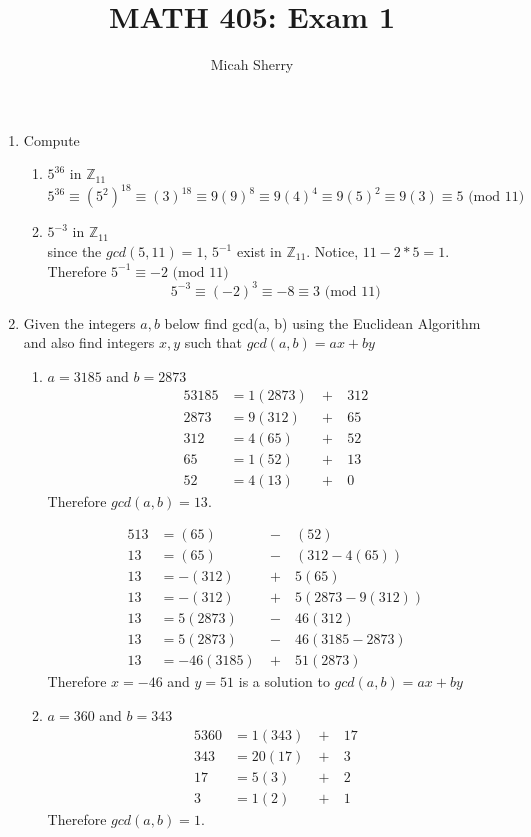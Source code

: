 \documentclass{article}
\title{MATH 405: Exam 1 }
\author{Micah Sherry}
\newcommand{\Z}{\mathbb{Z}}
\begin{document}
	\maketitle
	\begin{enumerate}
	\item Compute
	\begin{enumerate}
		\item $5^{36}$ in $\Z_{11}$
		$$
			5^{36} \equiv (5^2)^{18} \equiv (3)^{18} \equiv 9(9)^8 \equiv 9(4)^4 \equiv 9(5)^2 \equiv 9(3) \equiv 5 \text{ (mod 11)} 
		$$
		\item $5^{-3}$ in $\Z_{11}$ \\
		since the $gcd(5,11) = 1$, $5^{-1}$ exist in $\Z_{11}$.
		Notice, $11-2*5 =1$. Therefore $5^{-1}\equiv-2\text{ (mod 11)} $\\
		$$5^{-3} \equiv (-2)^3 \equiv -8\equiv 3 \text{ (mod 11)}$$
	\end{enumerate}
	\item Given the integers $a, b$ below find gcd(a, b) using the Euclidean Algorithm and also find integers $x, y$ such that $gcd(a,b) = ax + by$
	\begin{enumerate}
		\item $ a = 3185$ and $b = 2873$
		\begin{alignat*}{5}
			3185 &= 1(2873) \ &+\ &312 \\
			2873 &= 9(312)  \ &+\ &65  \\
			312  &= 4(65)   \ &+\ &52  \\
			65   &= 1(52)   \ &+\ &13  \\
			52   &= 4(13)   \ &+\ &0   
		\end{alignat*}
		Therefore $gcd(a,b)=13$.
		
		\begin{alignat*}{5}
			13 &= (65)   \ &-\ &(52) \\
			13 &= (65)   \ &-\ &(312 -4(65)) \\
			13 &= -(312)  \ &+\ &5(65) \\
			13 &= -(312)  \ &+\ &5(2873-9(312)) \\
			13 &= 5(2873) \ &-\ &46(312) \\
			13 &= 5(2873) \ &-\ &46(3185-2873) \\
			13 &= -46(3185)\ &+\ & 51(2873)
		\end{alignat*}
		Therefore $x= -46$ and $y =51$ is a solution to  $gcd(a,b) = ax + by$
		
		 \item $ a = 360$ and $b = 343$
		\begin{alignat*}{5}
			360 &= 1(343) \ &+\ &17\\
			343 &= 20(17) \ &+\ &3\\
			 17 &= 5(3)   \ &+\ &2\\
			  3 &= 1(2)   \ &+\ &1
		\end{alignat*}
		Therefore $gcd(a,b)=1$.
		

\end{enumerate}
\end{enumerate}
\end{document}

